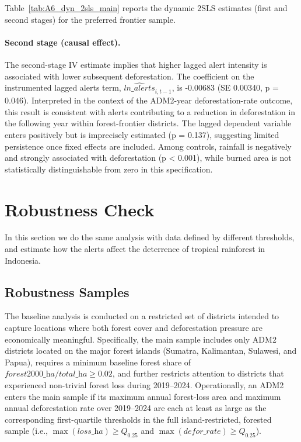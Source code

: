 \documentclass[hidelinks,12pt]{article}
\begin{document}
Table~\ref{tab:A6_dyn_2sls_main} reports the dynamic 2SLS estimates (first and second stages) for the preferred frontier sample.

\begin{table}[H]
  \caption{Dynamic 2SLS estimates (first and second stages), preferred frontier sample}
  \label{tab:A6_dyn_2sls_main}
  \centering
  
\end{table}



\paragraph{Second stage (causal effect).}
The second-stage IV estimate implies that higher lagged alert intensity is associated with lower subsequent deforestation. The coefficient on the instrumented lagged alerts term, $\widehat{\textit{ln\_alerts}}_{i,t-1}$, is -0.00683 (SE 0.00340, p = 0.046). Interpreted in the context of the ADM2-year deforestation-rate outcome, this result is consistent with alerts contributing to a reduction in deforestation in the following year within forest-frontier districts. The lagged dependent variable enters positively but is imprecisely estimated (p = 0.137), suggesting limited persistence once fixed effects are included. Among controls, rainfall is negatively and strongly associated with deforestation (p < 0.001), while burned area is not statistically distinguishable from zero in this specification.

\section{Robustness Check} \label{Robustness}
In this section we do the same analysis with data defined by different thresholds, and estimate how the alerts affect the deterrence of tropical rainforest in Indonesia.


\subsection{Robustness Samples}
\label{sec:robust_samples}

The baseline analysis is conducted on a restricted set of districts intended to capture locations where both forest cover and deforestation pressure are economically meaningful. Specifically, the main sample includes only ADM2 districts located on the major forest islands (Sumatra, Kalimantan, Sulawesi, and Papua), requires a minimum baseline forest share of
$\textit{forest2000\_ha}/\textit{total\_ha} \ge 0.02$,
and further restricts attention to districts that experienced non-trivial forest loss during 2019--2024. Operationally, an ADM2 enters the main sample if its maximum annual forest-loss area and maximum annual deforestation rate over 2019--2024 are each at least as large as the corresponding first-quartile thresholds in the full island-restricted, forested sample (i.e., $\max(\textit{loss\_ha}) \ge Q_{0.25}$ and $\max(\textit{defor\_rate}) \ge Q_{0.25}$).
\end{document}
